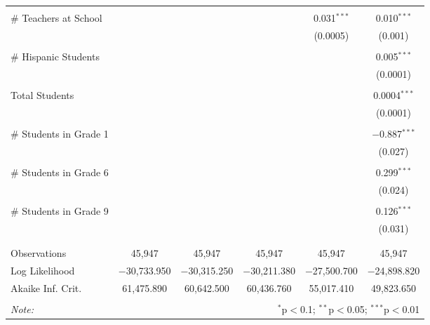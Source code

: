 \begin{table}[!htbp]
\begin{tabular}{@{\extracolsep{-2pt}}lccccc}
  & & & & & \\ 
 \# Teachers at School &  &  &  & 0.031$^{***}$ & 0.010$^{***}$ \\ 
  &  &  &  & (0.0005) & (0.001) \\ 
  & & & & & \\ 
 \# Hispanic Students &  &  &  &  & 0.005$^{***}$ \\ 
  &  &  &  &  & (0.0001) \\ 
  & & & & & \\ 
 Total Students &  &  &  &  & 0.0004$^{***}$ \\ 
  &  &  &  &  & (0.0001) \\ 
  & & & & & \\ 
 \# Students in Grade 1 &  &  &  &  & $-$0.887$^{***}$ \\ 
  &  &  &  &  & (0.027) \\ 
  & & & & & \\ 
 \# Students in Grade 6 &  &  &  &  & 0.299$^{***}$ \\ 
  &  &  &  &  & (0.024) \\ 
  & & & & & \\ 
 \# Students in Grade 9 &  &  &  &  & 0.126$^{***}$ \\ 
  &  &  &  &  & (0.031) \\ 
  & & & & & \\ 
\hline \\[-1.8ex] 
Observations & 45,947 & 45,947 & 45,947 & 45,947 & 45,947 \\ 
Log Likelihood & $-$30,733.950 & $-$30,315.250 & $-$30,211.380 & $-$27,500.700 & $-$24,898.820 \\ 
Akaike Inf. Crit. & 61,475.890 & 60,642.500 & 60,436.760 & 55,017.410 & 49,823.650 \\ 
\hline 
\hline \\[-1.8ex] 
\textit{Note:}  & \multicolumn{5}{r}{$^{*}$p$<$0.1; $^{**}$p$<$0.05; $^{***}$p$<$0.01} \\ 
\end{tabular} 
\end{table} 
